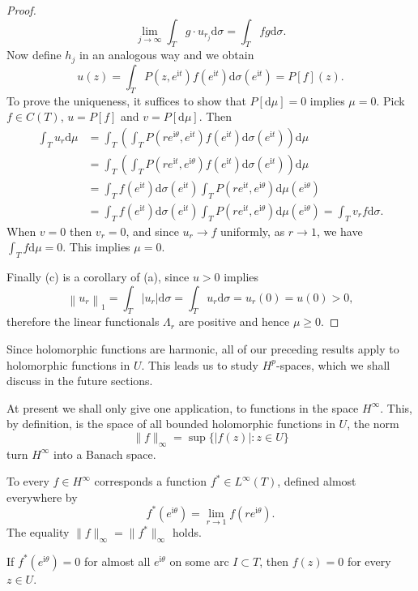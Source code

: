 \begin{proof}
$$
\lim_{j\rightarrow \infty} \int_T{g\cdot u_{r_j}\mathrm{d}\sigma}=\int_T{fg\mathrm{d}\sigma}.
$$
Now define $h_j$ in an analogous way and we obtain 
$$
u\left( z \right) =\int_T{P\left( z,e^{\mathrm{i}t} \right) f\left( e^{\mathrm{i}t} \right) \mathrm{d}\sigma \left( e^{\mathrm{i}t} \right)}=P\left[ f \right] \left( z \right) .
$$
To prove the uniqueness, it suffices to show that $P[\mathrm{d}\mu]=0$ implies $\mu=0$. Pick $f\in C(T)$, $u=P[f]$ and $v=P[\mathrm{d}\mu]$. Then 
$$
\begin{aligned}
\int_T{u_r\mathrm{d}\mu}&=\int_T{\left( \int_T{P\left( re^{\mathrm{i}\theta},e^{\mathrm{i}t} \right) f\left( e^{\mathrm{i}t} \right) \mathrm{d}\sigma \left( e^{\mathrm{i}t} \right)} \right) \mathrm{d}\mu}
\\
&=\int_T{\left( \int_T{P\left( re^{\mathrm{i}t},e^{\mathrm{i}\theta} \right) f\left( e^{\mathrm{i}t} \right) \mathrm{d}\sigma \left( e^{\mathrm{i}t} \right)} \right) \mathrm{d}\mu}
\\
&=\int_T{f\left( e^{\mathrm{i}t} \right) \mathrm{d}\sigma \left( e^{\mathrm{i}t} \right) \int_T{P\left( re^{\mathrm{i}t},e^{\mathrm{i}\theta} \right) \mathrm{d}\mu \left( e^{\mathrm{i}\theta} \right)}}
\\
&=\int_T{f\left( e^{\mathrm{i}t} \right) \mathrm{d}\sigma \left( e^{\mathrm{i}t} \right) \int_T{P\left( re^{\mathrm{i}t},e^{\mathrm{i}\theta} \right) \mathrm{d}\mu \left( e^{\mathrm{i}\theta} \right)}}=\int_T{v_rf\mathrm{d}\sigma}.
\end{aligned}
$$
When $v=0$ then $v_r=0$, and since $u_r\to f$ uniformly, as $r\to 1$, we have $\int_Tf\mathrm{d}\mu=0$. This implies $\mu=0$.\par
Finally (c) is a corollary of (a), since $u>0$ implies 
$$
\left\| u_r \right\| _1=\int_T{\left| u_r \right|\mathrm{d}\sigma}=\int_T{u_r\mathrm{d}\sigma}=u_r\left( 0 \right) =u\left( 0 \right) >0,
$$
therefore the linear functionals $\Lambda_r$ are positive and hence $\mu\ge 0$.
\end{proof}
Since holomorphic functions are harmonic, all of our preceding results apply to holomorphic functions in $U$. This leads us to study $H^p$-spaces, which we shall discuss in the future sections.\par
At present we shall only give one application, to functions in the space $H^\infty$. This, by definition, is the space of all bounded holomorphic functions in $U$, the norm 
$$\|f\|_\infty=\sup\{|f(z)|:z\in U\}$$
turn $H^\infty$ into a Banach space.
\begin{theorem}
To every $f\in H^\infty$ corresponds a function $f^*\in L^\infty(T)$, defined almost everywhere by 
$$f^*(e^{\mathrm{i}\theta})=\lim_{r\to 1}f(re^{\mathrm{i}\theta}).$$
The equality $\|f\|_\infty=\|f^*\|_\infty$ holds.\par
If $f^*(e^{\mathrm{i}\theta})=0$ for almost all $e^{\mathrm{i}\theta}$ on some arc $I\subset T$, then $f(z)=0$ for every $z\in U$.
\end{theorem}
